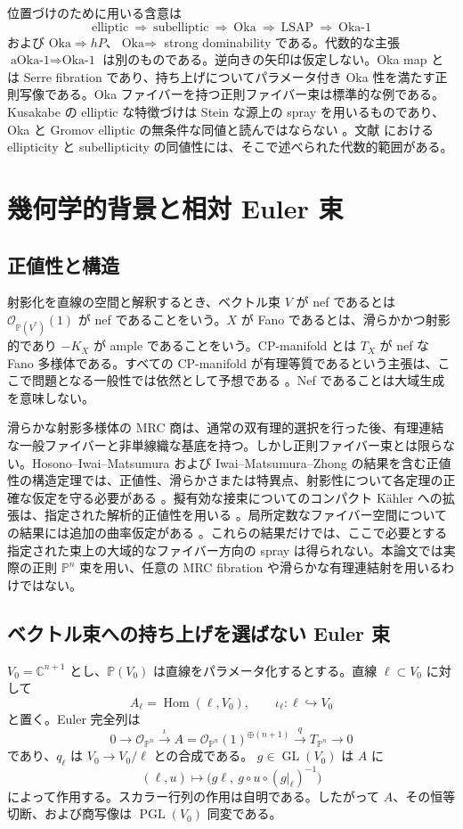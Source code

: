 \documentclass[12pt]{amsart}
\theoremstyle{definition}
\theoremstyle{remark}
\numberwithin{equation}{section}
\newcommand{\GL}{\operatorname{GL}}
\DeclareMathOperator{\Homop}{Hom}
\newcommand{\cO}{\mathcal{O}}
\newcommand{\C}{\mathbb{C}}
\newcommand{\mP}{\mathbb{P}}
\DeclareMathOperator{\PG}{PGL}
\begin{document}
位置づけのために用いる含意は
\[
\text{elliptic}\ \Longrightarrow\ \text{subelliptic}\ \Longrightarrow\ \text{Oka}
\ \Longrightarrow\ \text{LSAP}\ \Longrightarrow\ \text{Oka-1}
\]
および $\text{Oka}\Rightarrow hP$、$\text{Oka}\Rightarrow$ strong dominability である。代数的な主張 $\text{aOka-1}\Rightarrow\text{Oka-1}$ は別のものである。逆向きの矢印は仮定しない。Oka map とは Serre fibration であり、持ち上げについてパラメータ付き Oka 性を満たす正則写像である。Oka ファイバーを持つ正則ファイバー束は標準的な例である。Kusakabe の elliptic な特徴づけは Stein な源上の spray を用いるものであり、Oka と Gromov elliptic の無条件な同値と読んではならない \cite{ja:Kus21,ja:Kus24}。文献 \cite{ja:KZ} における ellipticity と subellipticity の同値性には、そこで述べられた代数的範囲がある。

\section{幾何学的背景と相対 Euler 束}
\subsection{正値性と構造}
射影化を直線の空間と解釈するとき、ベクトル束 $V$ が nef であるとは $\cO_{\mP(V^*)}(1)$ が nef であることをいう。$X$ が Fano であるとは、滑らかかつ射影的であり $-K_X$ が ample であることをいう。CP-manifold とは $T_X$ が nef な Fano 多様体である。すべての CP-manifold が有理等質であるという主張は、ここで問題となる一般性では依然として予想である \cite{ja:CP,ja:DPS}。Nef であることは大域生成を意味しない。

滑らかな射影多様体の MRC 商は、通常の双有理的選択を行った後、有理連結な一般ファイバーと非単線織な基底を持つ。しかし正則ファイバー束とは限らない。Hosono--Iwai--Matsumura および Iwai--Matsumura--Zhong の結果を含む正値性の構造定理では、正値性、滑らかさまたは特異点、射影性について各定理の正確な仮定を守る必要がある \cite{ja:HIM,ja:IMZ}。擬有効な接束についてのコンパクト K\"ahler への拡張は、指定された解析的正値性を用いる \cite{ja:MQ}。局所定数なファイバー空間についての結果には追加の曲率仮定がある \cite{ja:Muller}。これらの結果だけでは、ここで必要とする指定された束上の大域的なファイバー方向の spray は得られない。本論文では実際の正則 $\mP^n$ 束を用い、任意の MRC fibration や滑らかな有理連結射を用いるわけではない。

\subsection{ベクトル束への持ち上げを選ばない Euler 束}\label{ja:eulerconstruction}
$V_0=\C^{n+1}$ とし、$\mP(V_0)$ は直線をパラメータ化するとする。直線 $\ell\subset V_0$ に対して
\[
A_\ell=\Homop(\ell,V_0),\qquad
\iota_\ell:\ell\hookrightarrow V_0
\]
と置く。Euler 完全列は
\begin{equation}\label{ja:euler}
0\longrightarrow\cO_{\mP^n}\xrightarrow{\iota}
A=\cO_{\mP^n}(1)^{\oplus(n+1)}
\xrightarrow{q}T_{\mP^n}\longrightarrow0
\end{equation}
であり、$q_\ell$ は $V_0\to V_0/\ell$ との合成である。
$g\in\GL(V_0)$ は $A$ に
\[
(\ell,u)\longmapsto\bigl(g\ell,\ g\circ u\circ(g|_\ell)^{-1}\bigr)
\]
によって作用する。スカラー行列の作用は自明である。したがって $A$、その恒等切断、および商写像は $\PG(V_0)$ 同変である。
\end{document}
